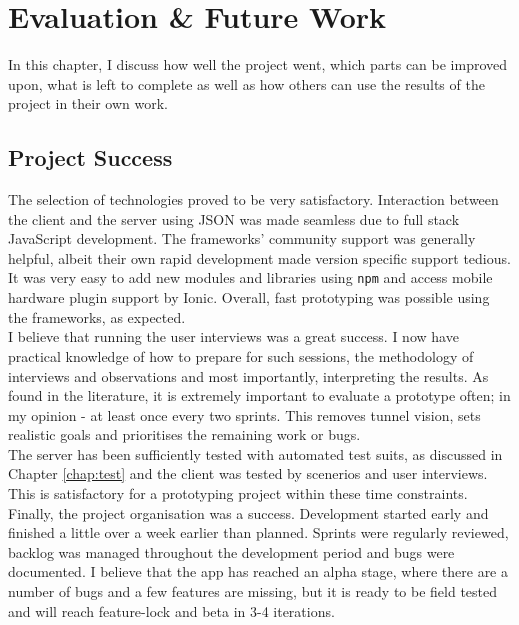 \chapter{Evaluation \& Future Work}

In this chapter, I discuss how well the project went, which parts can be improved upon, what is left to complete as well as how others can use the results of the project in their own work.

\section{Project Success}

The selection of technologies proved to be very satisfactory. Interaction between the client and the server using JSON was made seamless due to full stack JavaScript development. The frameworks' community support was generally helpful, albeit their own rapid development made version specific support tedious. It was very easy to add new modules and libraries using \texttt{npm} and access mobile hardware plugin support by Ionic. Overall, fast prototyping was possible using the frameworks, as expected.\\

I believe that running the user interviews was a great success. I now have practical knowledge of how to prepare for such sessions, the methodology of interviews and observations and most importantly, interpreting the results. As found in the literature, it is extremely important to evaluate a prototype often; in my opinion - at least once every two sprints. This removes tunnel vision, sets realistic goals and prioritises the remaining work or bugs.\\

The server has been sufficiently tested with automated test suits, as discussed in Chapter \ref{chap:test} and the client was tested by scenerios and user interviews. This is satisfactory for a prototyping project within these time constraints.\\

Finally, the project organisation was a success. Development started early and finished a little over a week earlier than planned. Sprints were regularly reviewed, backlog was managed throughout the development period and bugs were documented. I believe that the app has reached an alpha stage, where there are a number of bugs and a few features are missing, but it is ready to be field tested and will reach feature-lock and beta in 3-4 iterations. 

